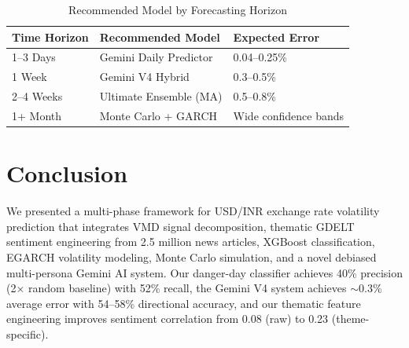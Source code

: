 \documentclass[11pt]{article}
\begin{document}
\begin{table}[t]
\centering
\small
\caption{Recommended Model by Forecasting Horizon}
\label{tab:recommended}
\begin{tabular}{lll}
\toprule
\textbf{Time Horizon} & \textbf{Recommended Model} & \textbf{Expected Error} \\
\midrule
1--3 Days & Gemini Daily Predictor & 0.04--0.25\% \\
1 Week & Gemini V4 Hybrid & 0.3--0.5\% \\
2--4 Weeks & Ultimate Ensemble (MA) & 0.5--0.8\% \\
1+ Month & Monte Carlo + GARCH & Wide confidence bands \\
\bottomrule
\end{tabular}
\end{table}

\section{Conclusion}
\label{sec:conclusion}

We presented a multi-phase framework for USD/INR exchange rate volatility prediction that integrates VMD signal decomposition, thematic GDELT sentiment engineering from 2.5 million news articles, XGBoost classification, EGARCH volatility modeling, Monte Carlo simulation, and a novel debiased multi-persona Gemini AI system. Our danger-day classifier achieves 40\% precision (2$\times$ random baseline) with 52\% recall, the Gemini V4 system achieves $\sim$0.3\% average error with 54--58\% directional accuracy, and our thematic feature engineering improves sentiment correlation from 0.08 (raw) to 0.23 (theme-specific).
\end{document}
